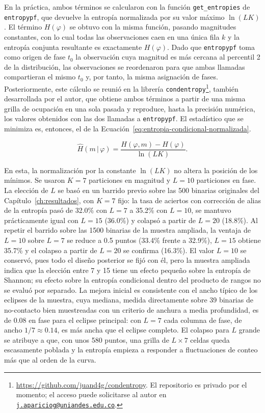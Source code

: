 \documentclass[12pt,letterpaper,oneside]{book}
\begin{document}
En la pr\'actica, ambos t\'erminos se calcularon con la funci\'on \texttt{get\_entropies} de \texttt{entropypf}, que devuelve la entrop\'ia normalizada por su valor m\'aximo $\ln(LK)$. El t\'ermino $H(\varphi)$ se obtuvo con la misma funci\'on, pasando magnitudes constantes, con lo cual todas las observaciones caen en una \'unica fila $k$ y la entrop\'ia conjunta resultante es exactamente $H(\varphi)$. Dado que \texttt{entropypf} toma como origen de fase $t_0$ la observaci\'on cuya magnitud es m\'as cercana al percentil 2 de la distribuci\'on, las observaciones se reordenaron para que ambas llamadas compartieran el mismo $t_0$ y, por tanto, la misma asignaci\'on de fases. Posteriormente, este c\'alculo se reuni\'o en la librer\'ia \texttt{condentropy}\footnote{\url{https://github.com/juand4g/condentropy}. El repositorio es privado por el momento; el acceso puede solicitarse al autor en \href{mailto:j.apariciog@uniandes.edu.co}{\nolinkurl{j.apariciog@uniandes.edu.co}}.}, tambi\'en desarrollada por el autor, que obtiene ambos t\'erminos a partir de una misma grilla de ocupaci\'on en una sola pasada y reproduce, hasta la precisi\'on num\'erica, los valores obtenidos con las dos llamadas a \texttt{entropypf}. El estad\'istico que se minimiza es, entonces, el de la Ecuaci\'on~\eqref{eq:entropia-condicional-normalizada}.

\begin{equation}
	\hat H(m\,|\,\varphi) = \frac{H(\varphi,m) - H(\varphi)}{\ln(LK)}.
	\label{eq:entropia-condicional-normalizada}
\end{equation}

En esta, la normalizaci\'on por la constante $\ln(LK)$ no altera la posici\'on de los m\'inimos. Se usaron $K=7$ particiones en magnitud y $L=10$ particiones en fase. La elecci\'on de $L$ se bas\'o en un barrido previo sobre las 500 binarias originales del Cap\'itulo~\ref{ch:resultados}, con $K=7$ fijo: la tasa de aciertos con correcci\'on de alias de la entrop\'ia pas\'o de 32.0\% con $L=7$ a 35.2\% con $L=10$, se mantuvo pr\'acticamente igual con $L=15$ (36.0\%) y colaps\'o a partir de $L=20$ (18.8\%). Al repetir el barrido sobre las 1500 binarias de la muestra ampliada, la ventaja de $L=10$ sobre $L=7$ se reduce a 0.5 puntos (33.4\% frente a 32.9\%), $L=15$ obtiene 35.7\% y el colapso a partir de $L=20$ se confirma (16.3\%). El valor $L=10$ se conserv\'o, pues todo el dise\~no posterior se fij\'o con \'el, pero la muestra ampliada indica que la elecci\'on entre 7 y 15 tiene un efecto peque\~no sobre la entrop\'ia de Shannon; su efecto sobre la entrop\'ia condicional dentro del producto de rangos no se evalu\'o por separado. La mejora inicial es consistente con el ancho t\'ipico de los eclipses de la muestra, cuya mediana, medida directamente sobre 39 binarias de no-contacto bien muestreadas con un criterio de anchura a media profundidad, es de 0.08 en fase para el eclipse principal: con $L=7$ cada columna de fase, de ancho $1/7\approx0.14$, es m\'as ancha que el eclipse completo. El colapso para $L$ grande se atribuye a que, con unos 580 puntos, una grilla de $L\times7$ celdas queda escasamente poblada y la entrop\'ia empieza a responder a fluctuaciones de conteo m\'as que al orden de la curva.
\end{document}
